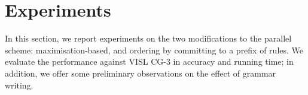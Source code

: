 









\section{Experiments}
\label{sec:eval}

In this section, we report experiments on the two modifications to the parallel scheme: maximisation-based, and ordering by committing to a prefix of rules.
We evaluate the performance against VISL CG-3 in accuracy and running time; in addition, we offer some preliminary observations on the effect of grammar writing.


